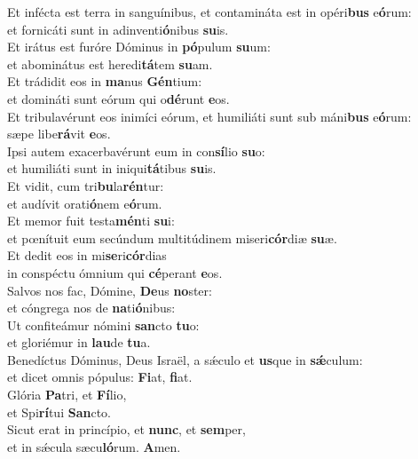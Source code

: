 \oddverse Et infécta est terra in sanguínibus, et contamináta est in opéri\textbf{bus} e\textbf{ó}rum:~\*\\
\oddverse et fornicáti sunt in adinventi\textbf{ó}nibus \textbf{su}is.\\
\evenverse Et irátus est furóre Dóminus in \textbf{pó}pulum \textbf{su}um:~\*\\
\evenverse et abominátus est heredi\textbf{tá}tem \textbf{su}am.\\
\oddverse Et trádidit eos in \textbf{ma}nus \textbf{Gén}tium:~\*\\
\oddverse et domináti sunt eórum qui o\textbf{dé}runt \textbf{e}os.\\
\evenverse Et tribulavérunt eos inimíci eórum, et humiliáti sunt sub máni\textbf{bus} e\textbf{ó}rum:~\*\\
\evenverse sæpe libe\textbf{rá}vit \textbf{e}os.\\
\oddverse Ipsi autem exacerbavérunt eum in con\textbf{sí}lio \textbf{su}o:~\*\\
\oddverse et humiliáti sunt in iniqui\textbf{tá}tibus \textbf{su}is.\\
\evenverse Et vidit, cum tri\textbf{bu}la\textbf{rén}tur:~\*\\
\evenverse et audívit orati\textbf{ó}nem e\textbf{ó}rum.\\
\oddverse Et memor fuit testa\textbf{mén}ti \textbf{su}i:~\*\\
\oddverse et pœnítuit eum secúndum multitúdinem miseri\textbf{cór}diæ \textbf{su}æ.\\
\evenverse Et dedit eos in mi\textbf{se}ri\textbf{cór}dias~\*\\
\evenverse in conspéctu ómnium qui \textbf{cé}perant \textbf{e}os.\\
\oddverse Salvos nos fac, Dómine, \textbf{De}us \textbf{no}ster:~\*\\
\oddverse et cóngrega nos de \textbf{na}ti\textbf{ó}nibus:\\
\evenverse Ut confiteámur nómini \textbf{san}cto \textbf{tu}o:~\*\\
\evenverse et gloriémur in \textbf{lau}de \textbf{tu}a.\\
\oddverse Benedíctus Dóminus, Deus Israël, a sǽculo et \textbf{us}que in \textbf{sǽ}culum:~\*\\
\oddverse et dicet omnis pópulus: \textbf{Fi}at, \textbf{fi}at.\\
\evenverse Glória \textbf{Pa}tri, et \textbf{Fí}lio,~\*\\
\evenverse et Spi\textbf{rí}tui \textbf{San}cto.\\
\oddverse Sicut erat in princípio, et \textbf{nunc}, et \textbf{sem}per,~\*\\
\oddverse et in sǽcula sæcu\textbf{ló}rum. \textbf{A}men.\\
